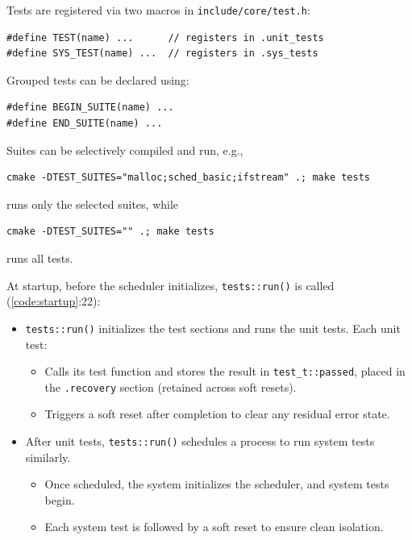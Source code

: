Tests are registered via two macros in \lstinline[style=myagc]|include/core/test.h|:
\begin{lstlisting}[style=myagc]
#define TEST(name) ...      // registers in .unit_tests
#define SYS_TEST(name) ...  // registers in .sys_tests
\end{lstlisting}
Grouped tests can be declared using:
\begin{lstlisting}[style=myagc]
#define BEGIN_SUITE(name) ...
#define END_SUITE(name) ...
\end{lstlisting}
Suites can be selectively compiled and run, e.g.,
\begin{lstlisting}[style=mybash]
cmake -DTEST_SUITES="malloc;sched_basic;ifstream" .; make tests
\end{lstlisting}
\vspace{-.7em}
runs only the selected suites, while
\begin{lstlisting}[style=mybash]
cmake -DTEST_SUITES="" .; make tests
\end{lstlisting}
\vspace{-.7em}
runs all tests.

At startup, before the scheduler initializes, \lstinline[style=myagc]|tests::run()| is
called (\autoref{code:startup}:22):
\begin{itemize}
    \item \lstinline[style=myagc]|tests::run()| initializes the test sections and runs
        the unit tests. Each unit test:
    \begin{itemize}
        \item Calls its test function and stores the result in
            \lstinline[style=myagc]|test_t::passed|, placed in the
            \lstinline[style=myagc]|.recovery| section (retained across soft resets).
        \item Triggers a soft reset after completion to clear any residual error state.
    \end{itemize}
    \item After unit tests, \lstinline[style=myagc]|tests::run()| schedules a process
        to run system tests similarly.
    \begin{itemize}
        \item Once scheduled, the system initializes the scheduler, and system tests
            begin.
        \item Each system test is followed by a soft reset to ensure clean isolation.
    \end{itemize}
\end{itemize}


